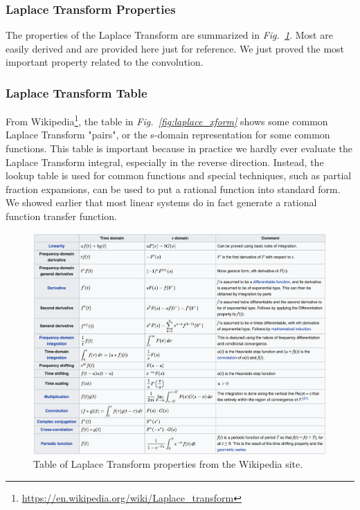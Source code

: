 \subsubsection{Laplace Transform Properties}
The properties of the Laplace Transform are summarized in \emph{Fig.~\ref{fig:laplace_table}}.   Most are easily derived and are provided here just for reference.  We just proved the most important property related to the convolution.    
\subsubsection{Laplace Transform Table}
From Wikipedia\footnote{\url{https://en.wikipedia.org/wiki/Laplace_transform}}, the table in \emph{Fig.~\ref{fig:laplace_xform}} shows some common Laplace Transform "pairs", or the s-domain representation for some common functions.  This table is important because in practice we hardly ever evaluate the Laplace Transform integral, especially in the reverse direction.  Instead, the lookup table is used for common functions and special techniques, such as partial fraction expansions, can be used to put a rational function into standard form.  We showed earlier that most linear systems do in fact generate a rational function transfer function.
\newpage
\begin{figure}[tb]
\centering
\includegraphics[width=.85\columnwidth]{laplace_table.png}
\caption{Table of Laplace Transform properties from the Wikipedia site.}
\label{fig:laplace_table}
\end{figure}
